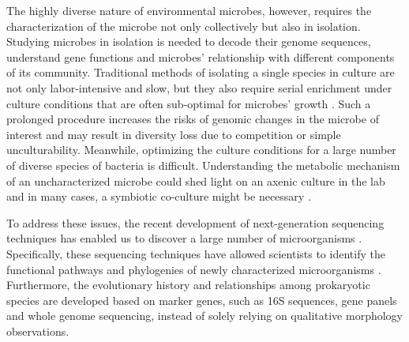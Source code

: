 
The highly diverse nature of environmental microbes, however, requires the characterization of the microbe not only collectively but also in isolation. Studying microbes in isolation is needed to decode their genome sequences, understand gene functions and microbes' relationship with different components of its community. Traditional methods of isolating a single species in culture are not only labor-intensive and slow, but they also require serial enrichment under culture conditions that are often sub-optimal for microbes' growth \cite{Blainey:2013dp}. Such a prolonged procedure increases the risks of genomic changes in the microbe of interest and may result in diversity loss due to competition or simple unculturability. Meanwhile, optimizing the culture conditions for a large number of diverse species of bacteria is difficult. 
Understanding the metabolic mechanism of an uncharacterized microbe could shed light on an axenic culture in the lab and in many cases, a symbiotic co-culture might be necessary \cite{HuiWang:2014gj}. 

To address these issues, the recent development of next-generation sequencing techniques has enabled us to discover a large number of microorganisms \cite{Rinke:2014fu,Stepanauskas:2007ir,Blainey:2011dk}. Specifically, these sequencing techniques have allowed scientists to identify the functional pathways and phylogenies of newly characterized microorganisms \cite{Rinke:2013bt}. Furthermore, the evolutionary history and relationships among prokaryotic species are developed based on marker genes, such as 16S sequences, gene panels and whole genome sequencing, instead of solely relying on qualitative morphology observations. 

